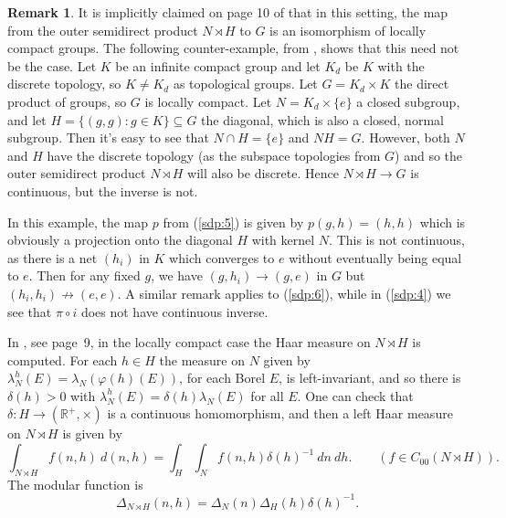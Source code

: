 \documentclass[twoside,a4paper,12pt]{article}
\theoremstyle{plain}
\theoremstyle{definition}
\newtheorem{remark}[proposition]{Remark}
\begin{document}
\begin{remark}
It is implicitly claimed on page 10 of \cite{kt} that in this setting, the map from the outer
semidirect product $N \rtimes H$ to $G$ is an isomorphism of locally compact groups.  The following
counter-example, from \cite{a3}, shows that this need not be the case.  Let $K$ be an infinite compact
group and let $K_d$ be $K$ with the discrete topology, so $K\not=K_d$ as topological groups.  Let
$G = K_d \times K$ the direct product of groups, so $G$ is locally compact.  Let $N = K_d \times \{e\}$
a closed subgroup, and let $H = \{ (g,g) : g\in K \} \subseteq G$ the diagonal, which is also a closed,
normal subgroup.  Then it's easy to see that $N\cap H=\{e\}$ and $NH = G$.  However, both $N$ and $H$ have
the discrete topology (as the subspace topologies from $G$) and so the outer semidirect product
$N \rtimes H$ will also be discrete.  Hence $N\rtimes H\rightarrow G$ is continuous, but the inverse is
not.

In this example, the map $p$ from (\ref{sdp:5}) is given by $p(g,h) = (h,h)$ which is obviously a
projection onto the diagonal $H$ with kernel $N$.  This is not continuous, as there is a net $(h_i)$ in
$K$ which converges to $e$ without eventually being equal to $e$.  Then for any fixed $g$, we have
$(g,h_i) \rightarrow (g,e)$ in $G$ but $(h_i,h_i) \not\rightarrow (e,e)$.  A similar remark applies
to (\ref{sdp:6}), while in (\ref{sdp:4}) we see that $\pi\circ i$ does not have continuous inverse.
\end{remark}

In \cite{kt}, see page~9, in the locally compact case the Haar measure on $N \rtimes H$ is computed.
For each $h\in H$ the measure on $N$ given by $\lambda_N^h(E) = \lambda_N(\varphi(h)(E))$, for each Borel $E$,
is left-invariant, and so there is $\delta(h)>0$ with $\lambda_N^h(E) = \delta(h) \lambda_N(E)$ for
all $E$.  One can check that $\delta:H\rightarrow (\mathbb R^+, \times)$ is a continuous homomorphism,
and then a left Haar measure on $N \rtimes H$ is given by
\[ \int_{N \rtimes H} f(n,h) \ d(n,h) = \int_H \int_N f(n,h) \delta(h)^{-1} \ dn \ dh. 
\qquad (f\in C_{00}(N \rtimes H)). \]
The modular function is
\[ \Delta_{N \rtimes H}(n,h) = \Delta_N(n) \Delta_H(h) \delta(h)^{-1}. \]
\end{document}
